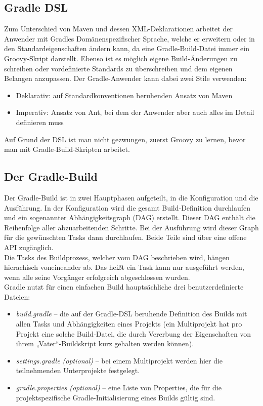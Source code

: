 \documentclass[a4paper]{article}
\begin{document}
\subsection{Gradle DSL}
Zum Unterschied von Maven und dessen XML-Deklarationen arbeitet der Anwender mit Gradles Domänenspezifischer Sprache, welche er erweitern oder in den Standardeigenschaften ändern kann, da eine Gradle-Build-Datei immer ein Groovy-Skript darstellt. Ebenso ist es möglich eigene Build-Änderungen zu schreiben oder vordefinierte Standards zu überschreiben und dem eigenen Belangen anzupassen. Der Gradle-Anwender kann dabei zwei Stile verwenden:
\begin{itemize}
	\item Deklarativ: auf Standardkonventionen beruhenden Ansatz von Maven 
	\item Imperativ: Ansatz von Ant, bei dem der Anwender aber auch alles im Detail definieren muss
\end{itemize}

Auf Grund der DSL ist man nicht gezwungen, zuerst Groovy zu lernen, bevor man mit Gradle-Build-Skripten arbeitet.
\subsection{Der Gradle-Build}
Der Gradle-Build ist in zwei Hauptphasen aufgeteilt, in die Konfiguration und die Ausführung. In der Konfiguration wird die gesamt Build-Definition durchlaufen und ein sogenannter Abhängigkeitsgraph (DAG) erstellt. Dieser DAG enthält die Reihenfolge aller abzuarbeitenden Schritte. Bei der Ausführung wird dieser Graph für die gewünschten Tasks dann durchlaufen. Beide Teile sind über eine offene API zugänglich.
\\
Die Tasks des Buildprozess, welcher vom DAG beschrieben wird, hängen hierachisch voneineander ab. Das heißt ein Task kann nur ausgeführt werden, wenn alle seine Vorgänger erfolgreich abgeschlossen wurden.
\\
Gradle nutzt für einen einfachen Build hauptsächliche drei benutzerdefinierte Dateien:
\begin{itemize}
	\item \textit{build.gradle} – die auf der Gradle-DSL beruhende Definition des Builds mit allen Tasks und Abhängigkeiten eines Projekts (ein Multiprojekt hat pro Projekt eine solche Build-Datei, die durch Vererbung der Eigenschaften von ihrem „Vater“-Buildskript kurz gehalten werden können).
    \item \textit{settings.gradle (optional)} – bei einem Multiprojekt werden hier die teilnehmenden Unterprojekte festgelegt.
    \item \textit{gradle.properties (optional)} – eine Liste von Properties, die für die projektspezifische Gradle-Initialisierung eines Builds gültig sind.
\end{itemize}
\end{document}
